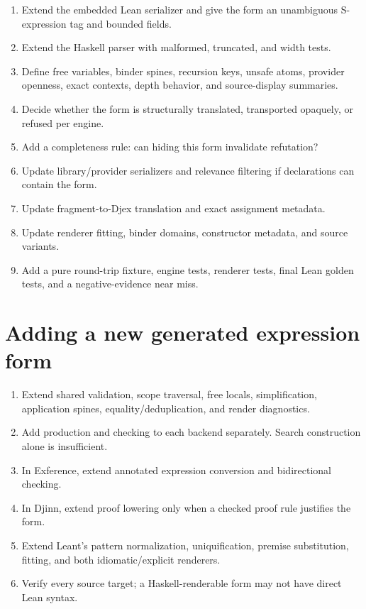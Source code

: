 \documentclass[10pt,letterpaper,oneside]{report}
\newcommand{\code}[1]{\texttt{\detokenize{#1}}}
\begin{document}
\begin{enumerate}
  \item Extend the embedded Lean serializer and give the form an unambiguous S-expression tag and bounded fields.
  \item Extend the Haskell parser with malformed, truncated, and width tests.
  \item Define free variables, binder spines, recursion keys, unsafe atoms, provider openness, exact contexts, depth behavior, and source-display summaries.
  \item Decide whether the form is structurally translated, transported opaquely, or refused per engine.
  \item Add a completeness rule: can hiding this form invalidate refutation?
  \item Update library/provider serializers and relevance filtering if declarations can contain the form.
  \item Update fragment-to-Djex translation and exact assignment metadata.
  \item Update renderer fitting, binder domains, constructor metadata, and source variants.
  \item Add a pure round-trip fixture, engine tests, renderer tests, final Lean golden tests, and a negative-evidence near miss.
\end{enumerate}

\section{Adding a new generated expression form}

\begin{enumerate}
  \item Extend shared \code{Generated} validation, scope traversal, free locals, simplification, application spines, equality/deduplication, and render diagnostics.
  \item Add production and checking to each backend separately. Search construction alone is insufficient.
  \item In Exference, extend annotated expression conversion and bidirectional checking.
  \item In Djinn, extend proof lowering only when a checked proof rule justifies the form.
  \item Extend Leant's pattern normalization, uniquification, premise substitution, fitting, and both idiomatic/explicit renderers.
  \item Verify every source target; a Haskell-renderable form may not have direct Lean syntax.
\end{enumerate}
\end{document}
